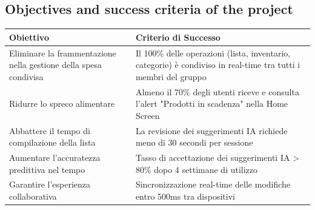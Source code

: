 \documentclass[12pt,a4paper]{article}
\begin{document}
\subsection{Objectives and success criteria of the project}

\begin{table}[h]
\centering
\begin{tabularx}{\textwidth}{|X|X|}
\hline
\textbf{Obiettivo} & \textbf{Criterio di Successo} \\
\hline
Eliminare la frammentazione nella gestione della spesa condivisa & Il 100\% delle operazioni (lista, inventario, categorie) è condiviso in real-time tra tutti i membri del gruppo \\
\hline
Ridurre lo spreco alimentare & Almeno il 70\% degli utenti riceve e consulta l'alert "Prodotti in scadenza" nella Home Screen \\
\hline
Abbattere il tempo di compilazione della lista & La revisione dei suggerimenti IA richiede meno di 30 secondi per sessione \\
\hline
Aumentare l'accuratezza predittiva nel tempo & Tasso di accettazione dei suggerimenti IA > 80\% dopo 4 settimane di utilizzo \\
\hline
Garantire l'esperienza collaborativa & Sincronizzazione real-time delle modifiche entro 500ms tra dispositivi \\
\hline
\end{tabularx}
\end{table}
\end{document}
